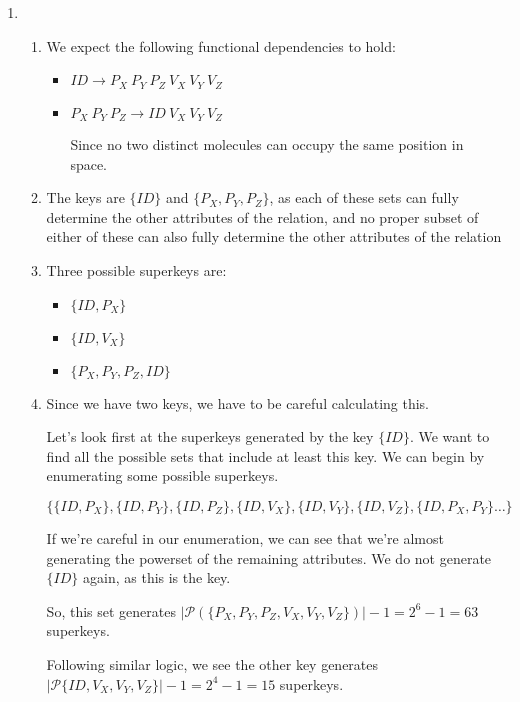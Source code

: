 \documentclass[12pt,letterpaper]{article}
\begin{document}
\begin{enumerate}
    \item
      \begin{enumerate}
        \item We expect the following functional dependencies to hold:
          \begin{itemize}
            \item $ID \rightarrow P_X \ P_Y \ P_Z \ V_X \ V_Y \ V_Z$
            \item $P_X \ P_Y \ P_Z \rightarrow ID \ V_X \ V_Y \ V_Z$

              Since no two distinct molecules can occupy the same position in space.
          \end{itemize}
        \item The keys are $\{ID\}$ and $\{P_X, P_Y, P_Z\}$,
          as each of these sets can fully determine the other attributes of the relation,
          and no proper subset of either of these can also fully determine the other attributes of the relation
        \item Three possible superkeys are:
          \begin{itemize}
            \item $\{ID, P_X\}$
            \item $\{ID, V_X\}$
            \item $\{P_X, P_Y, P_Z, ID\}$
          \end{itemize}
        \item
          Since we have two keys, we have to be careful calculating this.

          Let's look first at the superkeys generated by the key $\{ID\}$.
          We want to find all the possible sets that include at least this key.
          We can begin by enumerating some possible superkeys.

          \[\{\{ID, P_X\}, \{ID, P_Y\}, \{ID, P_Z\}, \{ID, V_X\}, \{ID, V_Y\}, \{ID, V_Z\}, \{ID, P_X, P_Y\} \dots \}\]

          If we're careful in our enumeration, we can see that we're almost generating the powerset of the remaining attributes.
          We do not generate $\{ID\}$ again, as this is the key.

          So, this set generates $|\mathcal{P}\left(\{P_X, P_Y, P_Z, V_X, V_Y, V_Z\}\right)| - 1 = 2^6 - 1 = 63$ superkeys.

          Following similar logic, we see the other key generates $|\mathcal{P}\{ID, V_X, V_Y, V_Z\}| - 1 = 2^4 - 1 = 15$ superkeys.


\end{enumerate}
\end{enumerate}
\end{document}
